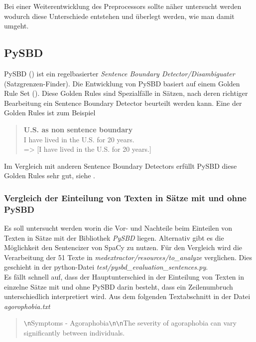 Bei einer Weiterentwicklung des Preprocessors sollte näher untersucht werden wodurch diese Unterschiede entstehen und überlegt werden, wie man damit umgeht.

\subsection{PySBD}
\label{evaluation_pysbd}
PySBD (\cite{sadvilkar_pysbd_2020}) ist ein regelbasierter \emph{Sentence Boundary Detector/Disambiguater} (Satzgrenzen-Finder). Die Entwicklung von PySBD basiert auf einem Golden Rule Set (\cite{golden_rules}). Diese Golden Rules sind Spezialfälle in Sätzen, nach deren richtiger Bearbeitung ein Sentence Boundary Detector beurteilt werden kann. Eine der Golden Rules ist zum Beispiel\\

\begin{quotation}
	\textbf{\glqq U.S. as non sentence boundary\grqq}\\
	I have lived in the U.S. for 20 years. \\
	=> [\glqq I have lived in the U.S. for 20 years.\grqq]
\end{quotation}

Im Vergleich mit anderen Sentence Boundary Detectors erfüllt PySBD diese Golden Rules sehr gut, siehe \cite{sadvilkar_pysbd_2020}.

\subsubsection{Vergleich der Einteilung von Texten in Sätze mit und ohne PySBD}
Es soll untersucht werden worin die Vor- und Nachteile beim Einteilen von Texten in Sätze mit der Bibliothek \emph{PySBD} liegen. 
Alternativ gibt es die Möglichkeit den Sentencizer von SpaCy zu nutzen. Für den Vergleich wird die Verarbeitung der 51 Texte in 
\emph{medextractor/resources/to\_analyze} verglichen. Dies geschieht in der python-Datei \emph{test/pysbd\_evaluation\_sentences.py}.\\

Es fällt schnell auf, dass der Hauptunterschied in der Einteilung von Texten in einzelne Sätze mit und ohne PySBD darin besteht, 
dass ein Zeilenumbruch unterschiedlich interpretiert wird.
Aus dem folgenden Textabschnitt in der Datei \emph{agorophobia.txt}\\

\begin{quotation}
	\glqq \verb!\n!Symptoms - Agoraphobia\verb!\n!\verb!\n!The severity of agoraphobia can vary significantly between individuals.\grqq
\end{quotation}

